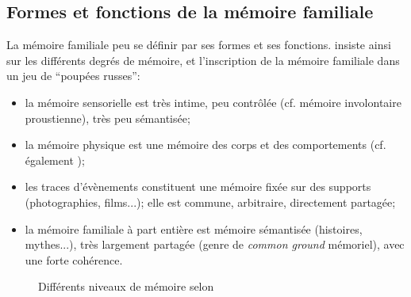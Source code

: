 \documentclass[french]{article}
\begin{document}
		\subsection{Formes et fonctions de la mémoire familiale}\label{formefonc}
			La mémoire familiale peu se définir par ses formes et ses fonctions. \cite{muxel2012} insiste ainsi sur les différents degrés de mémoire, et l'inscription de la mémoire familiale dans un jeu de ``poupées russes'':
			\begin{itemize}
				\item la mémoire sensorielle est très intime, peu contrôlée (cf. mémoire involontaire proustienne), très peu sémantisée;
				\item la mémoire physique est une mémoire des corps et des comportements (cf. également \cite[p.~121]{halbwachs1925});
				\item les traces d'évènements constituent une mémoire fixée sur des supports (photographies, films...); elle est commune, arbitraire, directement partagée;
				\item la mémoire familiale à part entière est mémoire sémantisée (histoires, mythes...), très largement partagée (genre de \textit{common ground} mémoriel), avec une forte cohérence.
			\end{itemize}
			\begin{figure}[H]
			\centering
			\caption{Différents niveaux de mémoire selon \cite{muxel2012}}
		\end{figure}
\end{document}
